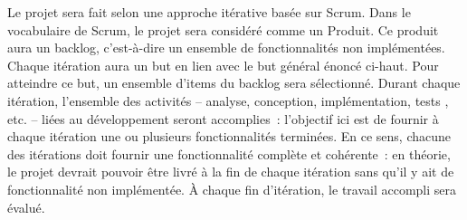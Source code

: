 Le projet sera fait selon une approche itérative basée sur Scrum. Dans le vocabulaire de Scrum, le projet sera considéré comme un Produit. Ce produit aura un backlog, c'est-à-dire un ensemble de fonctionnalités non implémentées. Chaque itération aura un but en lien avec le but général énoncé ci-haut. Pour atteindre ce but, un ensemble d'items du backlog sera sélectionné. Durant chaque itération, l'ensemble des activités – analyse, conception, implémentation, tests , etc. – liées au développement seront accomplies : l'objectif ici est de fournir à chaque itération une ou plusieurs fonctionnalités terminées. En ce sens, chacune des itérations doit fournir une fonctionnalité complète et cohérente : en théorie, le projet devrait pouvoir être livré à la fin de chaque itération sans qu'il y ait de fonctionnalité non implémentée. À chaque fin d'itération, le travail accompli sera évalué.
